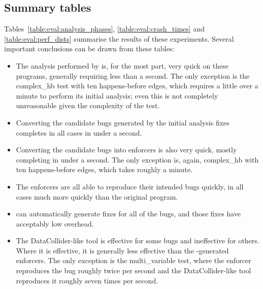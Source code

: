 \subsection{Summary tables}


Tables~\ref{table:eval:analysis_phases}, \ref{table:eval:crash_times}
and \ref{table:eval:perf_dists} summarise the results of these
experiments.  Several important conclusions can be drawn from these
tables:

\begin{itemize}
\item
  The analysis performed by {\technique} is, for the most part, very
  quick on these programs, generally requiring less than a second.
  The only exception is the complex\_hb test with ten happens-before
  edges, which requires a little over a minute to perform its initial
  analysis; even this is not completely unreasonable given the
  complexity of the test.
\item
  Converting the candidate bugs generated by the initial analysis
  fixes completes in all cases in under a second.
\item
  Converting the candidate bugs into enforcers is also very quick,
  mostly completing in under a second.  The only exception is,
  again, complex\_hb with ten happens-before edges, which takes
  roughly a minute.
\item
  The enforcers are all able to reproduce their intended bugs
  quickly, in all cases much more quickly than the original program.
\item
  {\Technique} can automatically generate fixes for all of the bugs,
  and those fixes have acceptably low overhead.
\item
  The DataCollider-like tool is effective for some bugs and
  ineffective for others.  Where it is effective, it is generally less
  effective than the {\technique}-generated enforcers.  The only
  exception is the multi\_variable test, where the {\technique}
  enforcer reproduces the bug roughly twice per second and the
  DataCollider-like tool reproduces it roughly seven times per
  second.  
\end{itemize}
        
